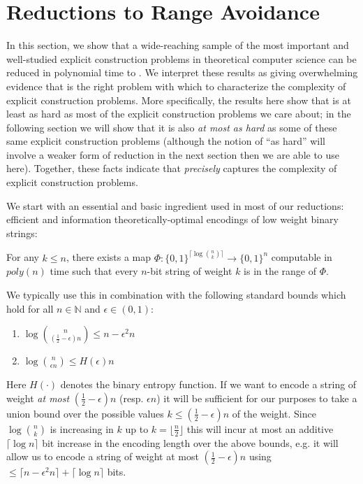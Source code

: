 \section{Reductions to Range Avoidance}\label{range:sec:reductions-to-range-avoidance}
In this section, we show that a wide-reaching sample of the most important and well-studied explicit construction problems in theoretical computer science can be reduced in polynomial time to \avoid. We interpret these results as giving overwhelming evidence that \avoid is the right problem with which to characterize the complexity of explicit construction problems. More specifically, the results here show that \avoid is at least as hard as most of the explicit construction problems we care about; in the following section we will show that it is also \emph{at most as hard} as some of these same explicit construction problems (although the notion of ``as hard'' will involve a weaker form of reduction in the next section then we are able to use here). Together, these facts indicate that \avoid \emph{precisely} captures the complexity of explicit construction problems.

We start with an essential and basic ingredient used in most of our reductions: efficient and information theoretically-optimal encodings of low weight binary strings:

\begin{lemma}\label{lem:sparse-enc}\cite{Coin-Problem}
For any $k \leq n$, there exists a map $\Phi: \{0,1\}^{\lceil \log\binom{n}{k}\rceil } \rightarrow \{0,1\}^n$ computable in $poly(n)$ time such that every $n$-bit string of weight $k$ is in the range of $\Phi$.
\end{lemma}

We typically use this in combination with the following standard bounds which hold for all $n \in \mathbb{N}$ and $\epsilon \in (0,1)$:
\begin{enumerate}
    \item $\log\binom{n}{(\frac{1}{2}-\epsilon)n} \leq n - \epsilon^2n$
    \item $\log \binom{n}{\epsilon n} \leq H(\epsilon)n$
\end{enumerate}
Here $H(\cdot)$ denotes the binary entropy function. If we want to encode a string of weight \emph{at most} $(\frac{1}{2}-\epsilon)n$ (resp. $\epsilon n$) it will be sufficient for our purposes to take a union bound over the possible values $k \leq (\frac{1}{2}-\epsilon)n$ of the weight. Since $\log\binom{n}{k}$ is increasing in $k$ up to $k = \lfloor \frac{n}{2} \rfloor$ this will incur at most an additive $\lceil \log n \rceil$ bit increase in the encoding length over the above bounds, e.g. it will allow us to encode a string of weight at most $(\frac{1}{2}-\epsilon)n$ using $\leq \lceil n - \epsilon^2n \rceil + \lceil \log n \rceil$ bits.
